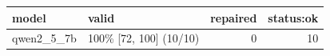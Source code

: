 \begin{tabular}{llrr}
\toprule
model & valid & repaired & status:ok \\
\midrule
qwen2\_5\_7b & 100\% [72, 100] (10/10) & 0 & 10 \\
\bottomrule
\end{tabular}
